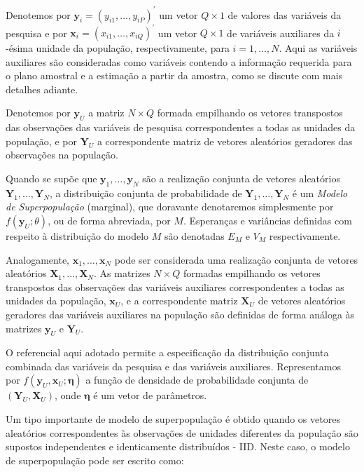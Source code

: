 \documentclass[
  12pt,
  brazilian,
]{book}
\theoremstyle{definition}
\theoremstyle{definition}
\theoremstyle{definition}
\theoremstyle{definition}
\theoremstyle{remark}
\begin{document}
Denotemos por \(\mathbf{y}_i=(y_{i1},...,y_{iP})^{\prime }\) um vetor \(Q \times 1\)
de valores das variáveis da pesquisa e por \(\mathbf{x}_{i} = (x_{i1}, \ldots, x_{iQ})^{\prime }\) um vetor \(Q\times 1\) de variáveis auxiliares da \(i\)-ésima unidade da população, respectivamente, para \(i=1,...,N\). Aqui as variáveis auxiliares são consideradas como variáveis contendo a informação requerida para o plano amostral e a estimação a partir da amostra, como se discute com mais detalhes adiante.

Denotemos por \(\mathbf{y}_{U}\) a matriz \(N \times Q\) formada empilhando os vetores transpostos das observações das variáveis de pesquisa correspondentes a todas as unidades da população, e por \(\mathbf{Y}_{U}\) a correspondente matriz de vetores aleatórios geradores das observações na população.

Quando se supõe que \(\mathbf{y}_1 , \ldots, \mathbf{y}_N\) são a realização
conjunta de vetores aleatórios \(\mathbf{Y}_1, \ldots, \mathbf{Y}_N\), a
distribuição conjunta de probabilidade de \(\mathbf{Y}_1, \ldots, \mathbf{Y}_N\) é
um \emph{Modelo de Superpopulação} (marginal), que doravante denotaremos simplesmente
por \(f(\mathbf{y}_U;\theta)\), ou de forma abreviada, por \(M\). Esperanças e
variâncias definidas com respeito à distribuição do modelo \(M\) são denotadas
\(E_M\) e \(V_M\) respectivamente.

Analogamente, \(\mathbf{x}_1, \ldots, \mathbf{x}_N\) pode ser considerada uma
realização conjunta de vetores aleatórios \(\mathbf{X}_1, \ldots, \mathbf{X}_N\).
As matrizes \(N \times Q\) formadas empilhando os vetores transpostos das
observações das variáveis auxiliares correspondentes a todas as unidades da
população, \(\mathbf{x}_{U}\), e a correspondente matriz \(\mathbf{X}_{U}\) de
vetores aleatórios geradores das variáveis auxiliares na população são definidas
de forma análoga às matrizes \(\mathbf{y}_{U}\) e \(\mathbf{Y}_{U}\).

O referencial aqui adotado permite a especificação da distribuição conjunta
combinada das variáveis da pesquisa e das variáveis auxiliares. Representamos
por \(f( \mathbf{y}_U , \mathbf{x}_U ; \mathbf{\eta} )\) a função de densidade de
probabilidade conjunta de \(( \mathbf{Y}_U , \mathbf{X}_U )\), onde \(\mathbf{\eta}\) é um vetor de parâmetros.

Um tipo importante de modelo de superpopulação é obtido quando os vetores
aleatórios correspondentes às observações de unidades diferentes da população
são supostos independentes e identicamente distribuídos - IID. Neste caso, o
modelo de superpopulação pode ser escrito como:
\end{document}
